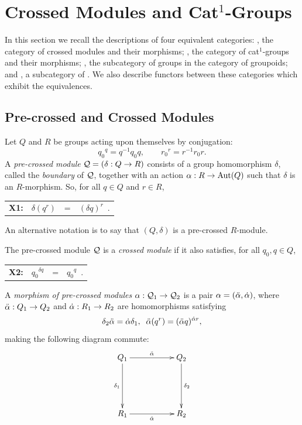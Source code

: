 
\section{Crossed Modules and Cat$^1$-Groups} \label{sect:xmod}

In this section we recall the descriptions of four equivalent categories:
\catXMod, the category of crossed modules and their morphisms;
, the category of cat$^1$-groups and their morphisms; 
\catGpGpd, the subcategory of groups in the category
\catGpd of groupoids; and 
\cattGp, a subcategory of \cattCat.
We also describe functors between these categories which exhibit
the equivalences.


\subsection{Pre-crossed and Crossed Modules}

Let $Q$ and $R$ be groups acting upon themselves by conjugation:
$$
{q_0}^q = q^{-1}q_0q, \qquad {r_0}^r = r^{-1}r_0r.
$$
A \emph{pre-crossed module}   
$\mathcal{Q} = (\delta : Q \to R )$ 
consists of a group homomorphism $\delta $,  
called the \emph{boundary} of $\mathcal{Q}$, 
together with an action 
$\alpha : R \to \mathrm{Aut}(Q)$ such that $\delta$  is an $R$-morphism.
So, for all $q \in Q$  and  $r \in R$,
\begin{center}
\begin{tabular}{c r c l }
\textbf{X1:} &  $\delta(q^r)$   &  =  &  $(\delta q)^r$~.
\end{tabular}
\end{center}
An alternative notation is to say that  $(Q,\delta)$
is a pre-crossed $R$-module.

The pre-crossed module  $\mathcal{Q}$  is a \emph{crossed module} 
if it also satisfies, for all  $q_0,q \in Q$,
\begin{center}
\begin{tabular}{c r c l }
\textbf{X2:} &  ${q_0}^{\delta q}$  &  =  &  ${q_0}^q$~. 
\end{tabular}
\end{center}

A \emph{morphism of pre-crossed modules}  
$\alpha : \mathcal{Q}_1 \to \mathcal{Q}_2$ 
is a pair  $\alpha = (\ddot{\alpha}, \dot{\alpha})$, where 
$\ddot{\alpha} : Q_1 \to Q_2$ and $\dot{\alpha} : R_1 \to R_2$ are homomorphisms satisfying
$$
\delta_2 \ddot{\alpha} = \dot{\alpha} \delta_1, \; \;
\ddot{\alpha}(q^r) = (\ddot{\alpha}  q)^{\dot{\alpha} r},
$$
making the following diagram commute:
\begin{equation} \label{eq:prexmod-morph} 
\vcenter{\xymatrix{ 
  Q_1 \ar[rr]^{\dda} \ar[dd]_{\delta_1}
     && Q_2 \ar[dd]^{\delta_2} \\
     &&  \\
  R_1 \ar[rr]_{\da}
     && R_2
}}
\end{equation} 

